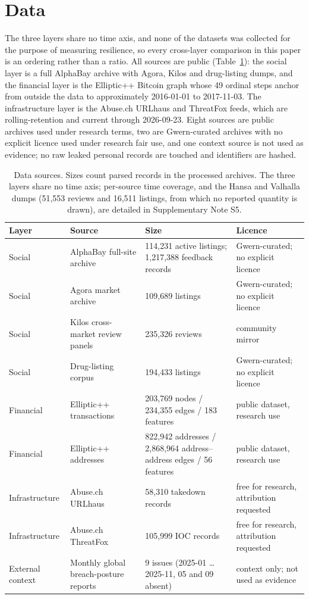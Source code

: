 \section{Data}

The three layers share no time axis, and none of the datasets was collected for
the purpose of measuring resilience, so every cross-layer comparison in this
paper is an ordering rather than a ratio. All sources are public
(Table~\ref{tab:data}): the social layer is a full AlphaBay archive with Agora,
Kilos and drug-listing dumps, and the financial layer is the Elliptic++ Bitcoin
graph whose 49 ordinal steps anchor from outside the data to approximately
2016-01-01 to 2017-11-03. The infrastructure layer is the Abuse.ch URLhaus
and ThreatFox feeds, which are rolling-retention and current through
2026-09-23. Eight sources are public archives used under research terms, two are
Gwern-curated archives with no explicit licence used under research fair use,
and one context source is not used as evidence; no raw leaked personal records
are touched and identifiers are hashed.

\begin{table}[t]
\caption{Data sources. Sizes count parsed records in the processed archives.
The three layers share no time axis; per-source time coverage, and the Hansa and
Valhalla dumps (51,553 reviews and 16,511 listings, from which no reported
quantity is drawn), are detailed in Supplementary Note S5.\label{tab:data}}
\footnotesize
\setlength{\tabcolsep}{4pt}
\begin{tabular}{@{}p{1.6cm}p{3.6cm}p{5.6cm}p{4.4cm}@{}}
\toprule
\textbf{Layer} & \textbf{Source} & \textbf{Size} & \textbf{Licence}\\
\midrule
Social & AlphaBay full-site archive & 114,231 active listings; 1,217,388 feedback records & Gwern-curated; no explicit licence\\
Social & Agora market archive & 109,689 listings & Gwern-curated; no explicit licence\\
Social & Kilos cross-market review panels & 235,326 reviews & community mirror\\
Social & Drug-listing corpus & 194,433 listings & Gwern-curated; no explicit licence\\
Financial & Elliptic++ transactions & 203,769 nodes / 234,355 edges / 183 features & public dataset, research use\\
Financial & Elliptic++ addresses & 822,942 addresses / 2,868,964 address--address edges / 56 features & public dataset, research use\\
Infrastructure & Abuse.ch URLhaus & 58,310 takedown records & free for research, attribution requested\\
Infrastructure & Abuse.ch ThreatFox & 105,999 IOC records & free for research, attribution requested\\
External context & Monthly global breach-posture reports & 9 issues (2025-01 \ldots{} 2025-11, 05 and 09 absent) & context only; not used as evidence\\
\bottomrule
\end{tabular}
\setlength{\tabcolsep}{6pt}
\end{table}
